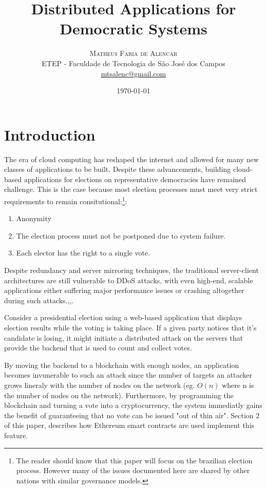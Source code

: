 \documentclass[twoside,twocolumn]{article}
\title{Distributed Applications for Democratic Systems} %
\author{%
\textsc{Matheus Faria de Alencar} \\[1ex] %
\normalsize ETEP - Faculdade de Tecnologia de S\~ao Jos\'e dos Campos \\ %
\normalsize \href{mailto:mtsalenc@gmail.com}{mtsalenc@gmail.com} %
}
\date{\today} %
\begin{document}
\maketitle


\section{Introduction}

The era of cloud computing has reshaped the internet and allowed for many new classes of applications to be built. Despite these advancements, building cloud-based applications for elections on representative democracies have remained challenge. This is the case because most election processes must meet very strict requirements to remain consitutional:\footnote{The reader should know that this paper will focus on the brazilian election process. However many of the issues documented here are shared by other nations with similar governance models.}:
\begin{enumerate}
\item Anonymity
\item The election process must not be postponed due to system failure.
\item Each elector has the right to a single vote.
\end{enumerate}

Despite redundancy and server mirroring techniques, the traditional server-client architectures are still vulnerable to DDoS attacks, with even high-end, scalable applications either suffering major performance issues or crashing altogether during such attacks.\cite{1},\cite{2},\cite{3}.

Consider a presidential election using a web-based application that displays election results while the voting is taking place. If a given party notices that it's candidate is losing, it might initiate a distributed attack on the servers that provide the backend that is used to count and collect votes. 

By moving the backend to a blockchain with enough nodes, an application becomes invunerable to such an attack since the number of targets an attacker grows lineraly with the number of nodes on the network (eg. $O(n)$ where n is the number of nodes on the network). Furthermore, by  programming the blockchain and turning a vote into a cryptocurrency, the system immediatly gains the benefit of guaranteeing that no vote can be issued "out of thin air". Section 2 of this paper, describes how Ethereum smart contracts are used implement this feature.
\end{document}
